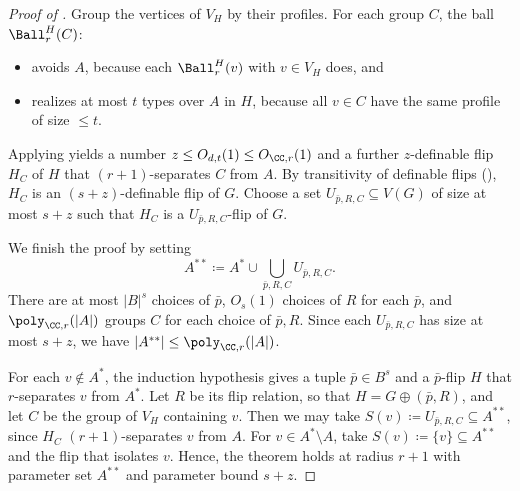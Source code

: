 \begin{proof}[Proof of ]
    Group the vertices of $V_H$ by their profiles.
    For each group $C$, the ball $\Ball_r^H(C)$:
    \begin{itemize}
        \item avoids $A$, because each $\Ball_r^H(v)$ with $v \in V_H$ does, and
        \item realizes at most $t$ types over $A$ in $H$, because all $v \in C$ have the same profile of size ${\leq}t$.
    \end{itemize}
    Applying  yields a
    number $z\le O_{d,t}(1)\le O_{\CC,r}(1)$ and a
    further $z$-definable flip $H_C$ of $H$ that $(r+1)$-separates $C$ from $A$.
    By transitivity of definable flips (), $H_C$ is an $(s+z)$-definable flip of $G$.
    Choose a set $U_{\bar p,R,C}\subseteq V(G)$ of size at most $s+z$ such that $H_C$ is a $U_{\bar p,R,C}$-flip of $G$.

    We finish the proof by setting
    \[
        A^{**}\coloneqq A^*\cup\bigcup_{\bar p,R,C}U_{\bar p,R,C}.
    \]
    There are at most $|B|^s$ choices of $\bar p$, $O_s(1)$ choices of $R$ for each $\bar p$, and $\poly_{\CC,r}(|A|)$ groups $C$ for each choice of $\bar p,R$.
    Since each $U_{\bar p,R,C}$ has size at most $s+z$, we have $|A^{**}|\leq\poly_{\CC,r}(|A|)$.

    For each $v\notin A^*$, the induction hypothesis gives a tuple $\bar p \in B^s$ and a $\bar p$-flip $H$ that $r$-separates $v$ from $A^*$.
    Let $R$ be its flip relation, so that $H=G\oplus (\bar p,R)$, and let $C$ be the group of $V_H$ containing $v$.
    Then we may take $S(v)\coloneqq U_{\bar p,R,C}\subseteq A^{**}$, since $H_C$ $(r+1)$-separates $v$ from $A$.
    For $v\in A^*\setminus A$, take $S(v)\coloneqq \{v\}\subseteq A^{**}$ and the flip that isolates $v$.
    Hence, the theorem holds at radius $r+1$ with parameter set $A^{**}$ and parameter bound $s+z$.
\end{proof}
